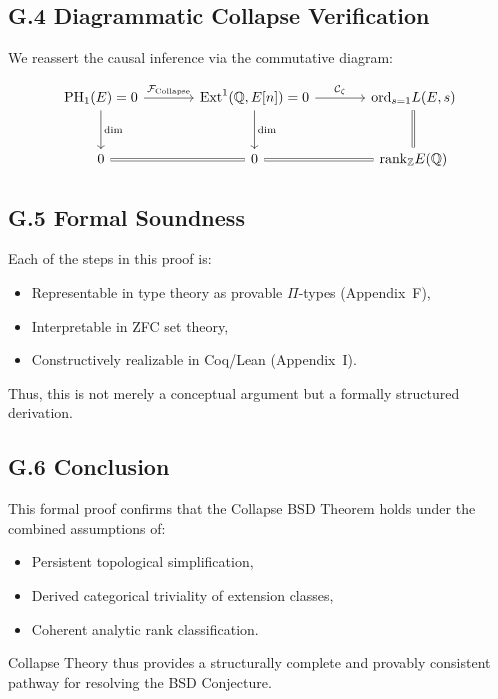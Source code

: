 \documentclass[11pt]{article}
\DeclareMathOperator{\Ext}{Ext}
\DeclareMathOperator{\PH}{PH}
\newcommand{\QQ}{\mathbb{Q}}
\newcommand{\ZZ}{\mathbb{Z}}
\begin{document}
\subsection*{G.4 Diagrammatic Collapse Verification}

We reassert the causal inference via the commutative diagram:

\[
\begin{tikzcd}[row sep=large, column sep=large]
\PH_1(E) = 0 \arrow[r, "\mathcal{F}_{\mathrm{Collapse}}"] \arrow[d, "\dim"]
& \Ext^1(\QQ,E[n]) = 0 \arrow[d, "\dim"] \arrow[r, "\mathcal{C}_{\zeta}"]
& \mathrm{ord}_{s=1} L(E,s) \arrow[d, equal] \\
0 \arrow[r, equal] & 0 \arrow[r, equal] & \mathrm{rank}_{\ZZ} E(\QQ)
\end{tikzcd}
\]

\subsection*{G.5 Formal Soundness}

Each of the steps in this proof is:
\begin{itemize}
  \item Representable in type theory as provable $\Pi$-types (Appendix~F),
  \item Interpretable in ZFC set theory,
  \item Constructively realizable in Coq/Lean (Appendix~I).
\end{itemize}

Thus, this is not merely a conceptual argument but a formally structured derivation.

\subsection*{G.6 Conclusion}

This formal proof confirms that the Collapse BSD Theorem holds under the combined assumptions of:
\begin{itemize}
  \item Persistent topological simplification,
  \item Derived categorical triviality of extension classes,
  \item Coherent analytic rank classification.
\end{itemize}

Collapse Theory thus provides a structurally complete and provably consistent pathway for resolving the BSD Conjecture.
\end{document}
